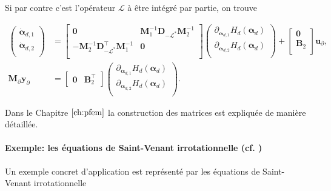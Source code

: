 Si par contre c'est l'opérateur $\mathcal{L}$ à être intégré par partie, on trouve

\begin{equation*}
\begin{aligned}
\begin{pmatrix}
\dot{\bm{\alpha}}_{d, 1} \\
\dot{\bm{\alpha}}_{d, 2} \\
\end{pmatrix}
&= \begin{bmatrix}
\mathbf{0} & \mathbf{M}_1^{-1} \mathbf{D}_{-\mathcal{L}^*} \mathbf{M}_2^{-1}\\
-\mathbf{M}_2^{-1} \mathbf{D}_{-\mathcal{L}^*}^\top \mathbf{M}_1^{-1} & \mathbf{0} \\
\end{bmatrix} 
\begin{pmatrix}
\partial_{\bm{\alpha}_{d, 1}} H_d(\bm{\alpha}_d)\\
\partial_{\bm{\alpha}_{d, 2}} H_d(\bm{\alpha}_d)\\
\end{pmatrix} + 
\begin{bmatrix}
\mathbf{0}\\
\mathbf{B}_2\\
\end{bmatrix}
\mathbf{u}_\partial, \\
\mathbf{M}_\partial {\mathbf{y}_\partial} &= 
\begin{bmatrix}
\mathbf{0} & \mathbf{B}_2^\top 
\end{bmatrix}\begin{pmatrix}
\partial_{\bm{\alpha}_{d, 1}} H_d(\bm{\alpha}_d)\\
\partial_{\bm{\alpha}_{d, 2}} H_d(\bm{\alpha}_d)\\
\end{pmatrix}.
\end{aligned}
\end{equation*}

Dans le Chapitre $\ref{ch:pfem}$ la construction des matrices est expliquée de manière détaillée.

\paragraph{Exemple: les équations de Saint-Venant irrotationnelle (cf. )}
Un exemple concret d'application est représenté par les équations de Saint-Venant irrotationnelle 

